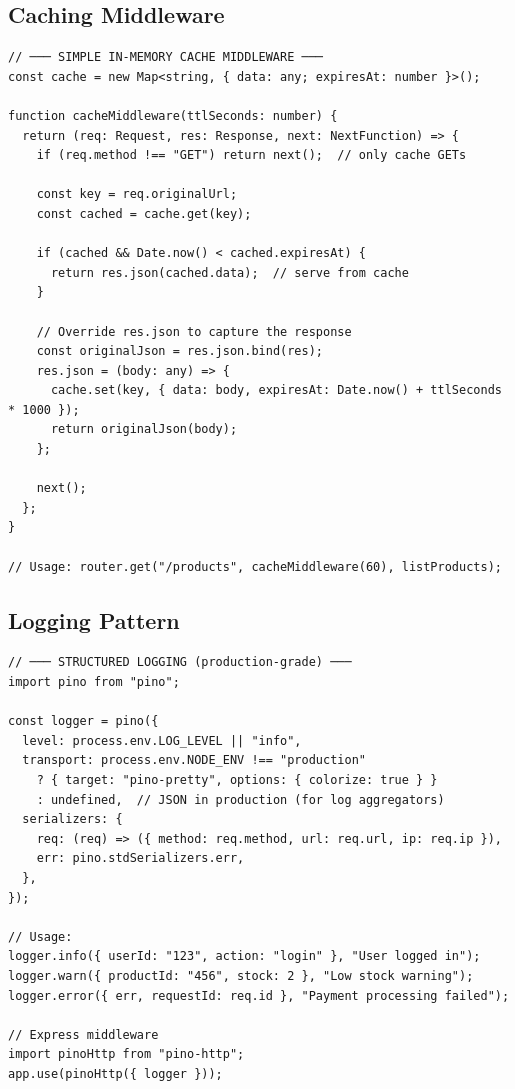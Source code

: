 \documentclass[10pt, a4paper]{article}
\begin{document}
\subsection{Caching Middleware}


\begin{lstlisting}[language=myjs]
// ─── SIMPLE IN-MEMORY CACHE MIDDLEWARE ───
const cache = new Map<string, { data: any; expiresAt: number }>();

function cacheMiddleware(ttlSeconds: number) {
  return (req: Request, res: Response, next: NextFunction) => {
    if (req.method !== "GET") return next();  // only cache GETs

    const key = req.originalUrl;
    const cached = cache.get(key);

    if (cached && Date.now() < cached.expiresAt) {
      return res.json(cached.data);  // serve from cache
    }

    // Override res.json to capture the response
    const originalJson = res.json.bind(res);
    res.json = (body: any) => {
      cache.set(key, { data: body, expiresAt: Date.now() + ttlSeconds * 1000 });
      return originalJson(body);
    };

    next();
  };
}

// Usage: router.get("/products", cacheMiddleware(60), listProducts);
\end{lstlisting}


\subsection{Logging Pattern}


\begin{lstlisting}[language=myjs]
// ─── STRUCTURED LOGGING (production-grade) ───
import pino from "pino";

const logger = pino({
  level: process.env.LOG_LEVEL || "info",
  transport: process.env.NODE_ENV !== "production"
    ? { target: "pino-pretty", options: { colorize: true } }
    : undefined,  // JSON in production (for log aggregators)
  serializers: {
    req: (req) => ({ method: req.method, url: req.url, ip: req.ip }),
    err: pino.stdSerializers.err,
  },
});

// Usage:
logger.info({ userId: "123", action: "login" }, "User logged in");
logger.warn({ productId: "456", stock: 2 }, "Low stock warning");
logger.error({ err, requestId: req.id }, "Payment processing failed");

// Express middleware
import pinoHttp from "pino-http";
app.use(pinoHttp({ logger }));
\end{lstlisting}
\end{document}
